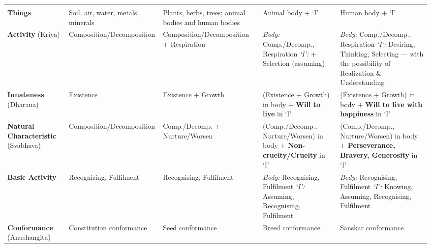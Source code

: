 \renewcommand{\arraystretch}{1.3}
\begin{longtable}{P{27mm} P{31mm} P{31mm} P{31mm} P{31mm}}
 &  &  &
   &  \\ \hline \endfirsthead
{} &  &  &
   &  \\ \hline \endhead
\textbf{Things} & Soil, air, water, metals, minerals &
  Plants, herbs, trees; animal bodies and human bodies &
  Animal body $+$ `I' & Human body $+$ `I' \\ \hline
\textbf{Activity} \newline (Kriya) & Composition\slash Decomposition &
  Composition\slash Decomposition $+$ Respiration &
  \emph{Body:} Comp.\slash Decomp., Respiration\newline
  \emph{`I':} $+$ Selection (assuming) &
  \emph{Body:} Comp.\slash Decomp., Respiration\newline
  \emph{`I':} Desiring, Thinking, Selecting --- with the possibility of
  Realization \& Understanding \\ \hline
\textbf{Innateness} \newline (Dharana) & Existence & Existence $+$ Growth &
  (Existence $+$ Growth) in body $+$ \textbf{Will to live} in `I' &
  (Existence $+$ Growth) in body $+$ \textbf{Will to live with happiness} in
  `I' \\ \hline
\textbf{Natural Charac\-teristic} \newline (Svabhava) &
  Composition\slash Decomposition &
  Comp.\slash Decomp. $+$ Nurture\slash Worsen &
  (Comp.\slash Decomp., Nurture\slash Worsen) in body $+$
  \textbf{Non-cruelty\slash Cruelty} in `I' &
  (Comp.\slash Decomp., Nurture\slash Worsen) in body $+$
  \textbf{Perseverance, Bravery, Generosity} in `I' \\ \hline
\textbf{Basic Activity} & Recognising, Fulfilment &
  Recognising, Fulfilment &
  \emph{Body:} Recognising, Fulfilment\newline
  \emph{`I':} Assuming, Recognising, Fulfilment &
  \emph{Body:} Recognising, Fulfilment\newline
  \emph{`I':} Knowing, Assuming, Recognising, Fulfilment \\ \hline
\textbf{Conformance} \newline (Anushangita) & Constitution conformance &
  Seed conformance & Breed conformance & Sanskar conformance \\ \hline
\end{longtable}

